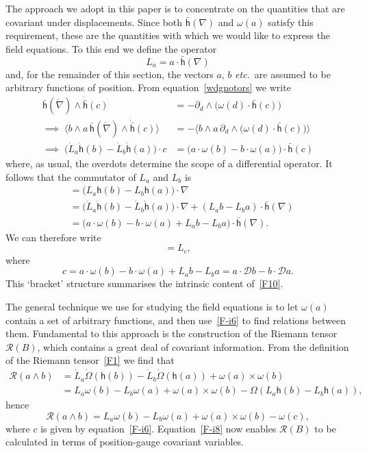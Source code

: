 \documentclass[a4paper]{article}
\numberwithin{equation}{section}
\newcommand{\nn}{\nonumber}
\newcommand{\dt}{\! \cdot \!}
\newcommand{\wdg}{\! \wedge \!}
\newcommand{\crs}{\! \times \!}
\newcommand{\la}{\langle}
\newcommand{\ra}{\rangle}
\newcommand{\etc}{\textit{etc.}}
\newcommand{\eqv}{=}
\newcommand{\om}{\omega}
\newcommand{\Om}{\Omega}
\newcommand{\cld}{{\mathcal{D}}}
\newcommand{\clr}{{\mathcal{R}}}
\newcommand{\dd}{\partial_d}
\newcommand{\lih}{\mathsf{h}}
\newcommand{\lbh}{\bar{\mathsf{h}}}
\newcommand{\ho}{\lbh}
\newcommand{\hu}{\lih}
\newcommand{\grad}{\nabla}
\newcommand{\dgrad}{\dot{\grad}}
\newcommand{\dho}{\dot{\lbh}}
\newcommand{\dhu}{\dot{\lih}}
\newcommand{\dL}{\dot{L}}
\newcommand{\dOm}{\dot{\Om}}
\begin{document}
The approach we adopt in this paper is to concentrate on the
quantities that are covariant under displacements.  Since both
$\ho(\grad)$ and $\om(a)$ satisfy this requirement, these are the
quantities with which we would like to express the field equations.
To this end we define the operator
%
\begin{equation}
L_a \eqv a \dt \ho(\grad)
\end{equation} 
%
and, for the remainder of this section, the vectors $a$, $b$ \etc\ are
assumed to be arbitrary functions of position.  From
equation~\eqref{wdgnotors} we write
%
\begin{align}
\ho(\dgrad) \wdg \dho(c) &= -\dd \wdg \bigl(\om(d) \dt \ho(c) \bigr)
\nn \\ 
\implies \; \la b \wdg a \, \ho(\dgrad) \wdg \dho(c) \ra &= - \bigl\la
b \wdg a \, \dd \wdg \bigl(\om(d) \dt \ho(c)\bigr) \bigr\ra  \nn \\
\implies \; \bigl(\dL_a \dhu(b) - \dL_b \dhu(a)\bigr) \dt c &= \bigl(a
\dt \om(b) - b \dt \om(a)\bigr) \dt \ho(c)
\label{F-i4}
\end{align}
%
where, as usual, the overdots determine the scope of a differential
operator.  It follows that the commutator of $L_a$ and $L_b$ is
%
\begin{align}
[L_a, L_b] 
&= \bigl(L_a \hu(b) - L_b \hu(a)\bigr)\dt \grad \nn \\
&= \bigl(\dL_a \dhu(b) - \dL_b \dhu(a)\bigr) \dt \grad + (L_a b - L_b a) \dt
\ho(\grad) \nn \\
&= \bigl(a \dt \om(b) - b \dt \om(a) + L_a b - L_b a\bigr) \dt \ho(\grad).
\end{align}
%
We can therefore write
%
\begin{equation}
[L_a, L_b] = L_c,
\label{F-i55}
\end{equation}
%
where
%
\begin{equation}
c = a \dt \om(b) - b \dt \om(a) + L_a b - L_b a = a\dt\cld b -
b\dt\cld a.
\label{F-i6}
\end{equation} 
%
This `bracket' structure summarises the intrinsic content of~\eqref{F10}.


The general technique we use for studying the field equations is to
let $\om(a)$ contain a set of arbitrary functions, and then
use~\eqref{F-i6} to find relations between them.  Fundamental to this
approach is the construction of the Riemann tensor $\clr(B)$, which
contains a great deal of covariant information.  From the definition
of the Riemann tensor~\eqref{F1} we find that
%
\begin{align}
\clr(a \wdg b) 
&= \dL_a \dOm( \hu(b)) - \dL_b \dOm (\hu(a)) + \om(a) \crs \om(b) \nn \\
&= L_a \om(b) - L_b \om(a) + \om(a) \crs \om(b) - \Om(L_a \hu(b) -
L_b \hu(a)),
\end{align}
%
hence
%
\begin{equation}
\clr(a \wdg b) = L_a  \om(b) - L_b \om(a) + \om(a) \crs \om(b) -
\om(c),
\label{F-i8}
\end{equation} 
%
where $c$ is given by equation~\eqref{F-i6}.  Equation~\eqref{F-i8} now
enables $\clr(B)$ to be calculated in terms of position-gauge
covariant variables.
\end{document}
